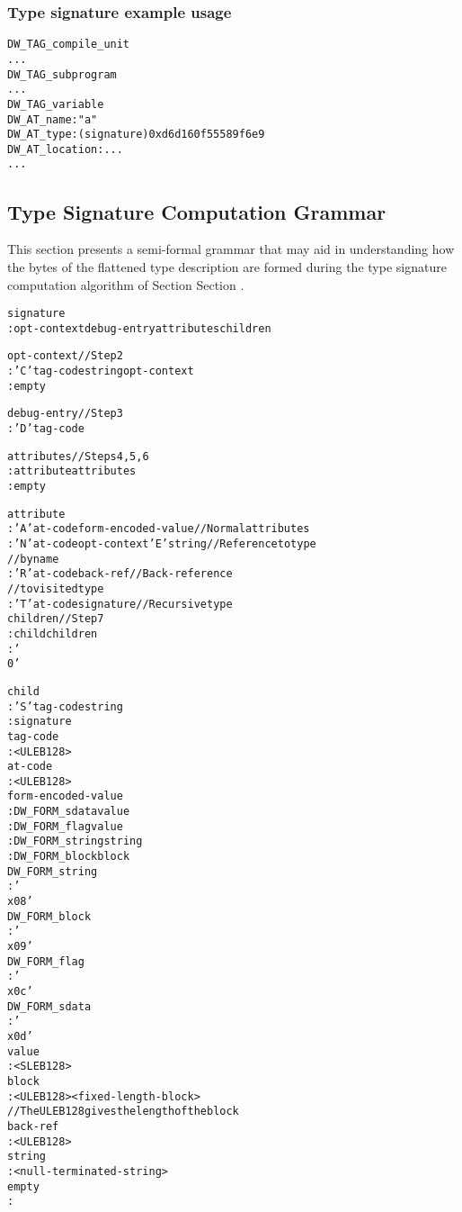 \subsubsection{Type signature example usage}
\label{app:typesignatureexampleusage}

\begin{alltt}
  DW\_TAG\_compile\_unit
  ...
  DW\_TAG\_subprogram
    ...
    DW\_TAG\_variable
      DW\_AT\_name: "a"
      DW\_AT\_type: (signature) 0xd6d160f5 5589f6e9
      DW\_AT\_location: ...
    ...
\end{alltt}

\subsection{Type Signature Computation Grammar}
\label{app:typesignaturecomputationgrammar}

This section
presents a semi-formal grammar that may aid in understanding
how the bytes of the flattened type description are formed
during the type signature computation algorithm of Section
Section . 


\begin{alltt}
signature
    : opt-context debug-entry attributes children

opt-context           // Step 2
    : 'C' tag-code string opt-context
    : empty

debug-entry           // Step 3
    : 'D' tag-code

attributes            // Steps 4, 5, 6
    : attribute attributes
    : empty

attribute
    : 'A' at-code form-encoded-value     // Normal attributes
    : 'N' at-code opt-context 'E' string // Reference to type
                                         // by name
    : 'R' at-code back-ref               // Back-reference 
                                         // to visited type
    : 'T' at-code signature              // Recursive type
children             //  Step 7
    : child children
    : '\\0'

child
    : 'S' tag-code string
    : signature
tag-code
    : <ULEB128>
at-code
    : <ULEB128>
form-encoded-value
    : DW\_FORM\_sdata value
    : DW\_FORM\_flag value
    : DW\_FORM\_string string
    : DW\_FORM\_block block
DW\_FORM\_string
    : '\\x08'
DW\_FORM\_block
    : '\\x09'
DW\_FORM\_flag
    : '\\x0c'
DW\_FORM\_sdata
    : '\\x0d'
value
    : <SLEB128>
block
    : <ULEB128> <fixed-length-block>
                      // The ULEB128 gives the length of the block
back-ref
    : <ULEB128>
string
    : <null-terminated-string>
empty
    :
\end{alltt}


